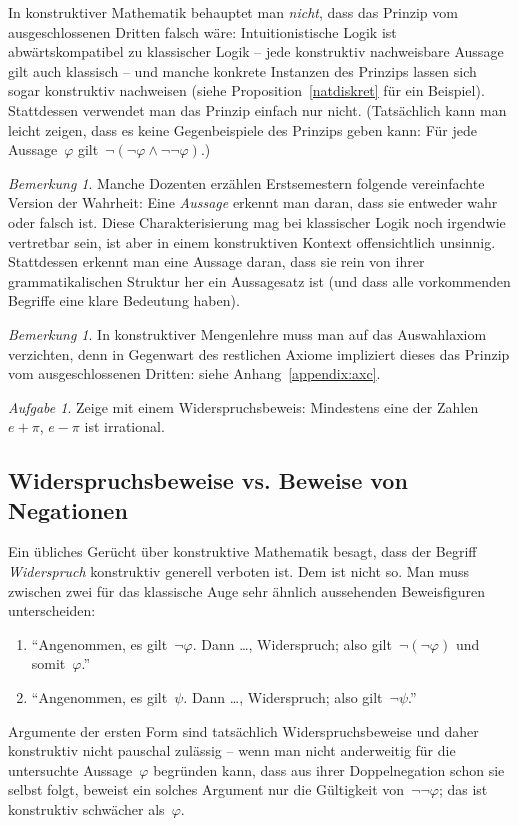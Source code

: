 \documentclass[a4paper,ngerman,12pt]{scrartcl}
\theoremstyle{definition}
\theoremstyle{plain}
\theoremstyle{remark}
\newtheorem{bem}[defn]{Bemerkung}
\newtheorem{aufg}[defn]{Aufgabe}
\renewcommand{\_}{\mathpunct{.}\,}
\newcommand{\?}{\,{:}\,}
\begin{document}
In konstruktiver Mathematik behauptet man \emph{nicht}, dass das
Prinzip vom ausgeschlossenen Dritten falsch wäre: Intuitionistische Logik ist
abwärtskompatibel zu klassischer Logik -- jede konstruktiv nachweisbare Aussage
gilt auch klassisch -- und manche konkrete Instanzen des Prinzips lassen sich
sogar konstruktiv nachweisen (siehe Proposition~\ref{natdiskret} für ein Beispiel).
Stattdessen verwendet man das Prinzip einfach
nur nicht. (Tatsächlich kann man leicht zeigen, dass es keine Gegenbeispiele
des Prinzips geben kann: Für jede Aussage~$\varphi$ gilt~$\neg(\neg\varphi
\wedge \neg\neg\varphi)$.)

\begin{bem}Manche Dozenten erzählen Erstsemestern folgende vereinfachte Version
der Wahrheit: Eine \emph{Aussage}
erkennt man daran, dass sie entweder wahr oder falsch ist. Diese
Charakterisierung mag bei klassischer Logik noch irgendwie vertretbar sein, ist aber in
einem konstruktiven Kontext offensichtlich unsinnig. Stattdessen erkennt man
eine Aussage daran, dass sie rein von ihrer grammatikalischen Struktur her ein
Aussagesatz ist (und dass alle vorkommenden Begriffe eine klare
Bedeutung haben).\end{bem}

\begin{bem}In konstruktiver Mengenlehre muss man auf das Auswahlaxiom
verzichten, denn in Gegenwart des restlichen Axiome impliziert dieses das
Prinzip vom ausgeschlossenen Dritten: siehe Anhang~\ref{appendix:axc}.\end{bem}

\begin{aufg}Zeige mit einem Widerspruchsbeweis: Mindestens eine der Zahlen~$e +
\pi$, $e - \pi$ ist irrational.\end{aufg}


\subsection{Widerspruchsbeweise vs. Beweise von Negationen}
\label{widerspruchvsnegation}

Ein übliches Gerücht über konstruktive Mathematik besagt, dass der Begriff
\emph{Widerspruch} konstruktiv generell verboten ist. Dem ist nicht so. Man
muss zwischen zwei für das klassische Auge sehr ähnlich aussehenden
Beweisfiguren unterscheiden:
\begin{enumerate}
\item[1.] "`Angenommen, es gilt~$\neg\varphi$. Dann \ldots, Widerspruch; also
gilt~$\neg(\neg\varphi)$ und somit~$\varphi$."'
\item[2.] "`Angenommen, es gilt~$\psi$. Dann \ldots, Widerspruch; also
gilt~$\neg\psi$."'
\end{enumerate}
Argumente der ersten Form sind tatsächlich Widerspruchsbeweise und daher
konstruktiv nicht pauschal zulässig -- wenn man nicht anderweitig für die
untersuchte Aussage~$\varphi$ begründen
kann, dass aus ihrer Doppelnegation schon sie selbst folgt, beweist ein
solches Argument nur die Gültigkeit von~$\neg\neg\varphi$; das ist konstruktiv
schwächer als~$\varphi$.
\end{document}
